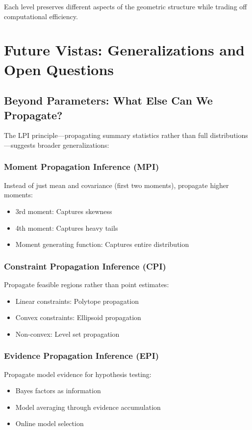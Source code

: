 \documentclass[11pt]{article}
\begin{document}
Each level preserves different aspects of the geometric structure while trading off computational efficiency.

\section{Future Vistas: Generalizations and Open Questions}

\subsection{Beyond Parameters: What Else Can We Propagate?}

The LPI principle—propagating summary statistics rather than full distributions—suggests broader generalizations:

\subsubsection{Moment Propagation Inference (MPI)}
Instead of just mean and covariance (first two moments), propagate higher moments:
\begin{itemize}
\item 3rd moment: Captures skewness
\item 4th moment: Captures heavy tails
\item Moment generating function: Captures entire distribution
\end{itemize}

\subsubsection{Constraint Propagation Inference (CPI)}
Propagate feasible regions rather than point estimates:
\begin{itemize}
\item Linear constraints: Polytope propagation
\item Convex constraints: Ellipsoid propagation
\item Non-convex: Level set propagation
\end{itemize}

\subsubsection{Evidence Propagation Inference (EPI)}
Propagate model evidence for hypothesis testing:
\begin{itemize}
\item Bayes factors as information
\item Model averaging through evidence accumulation
\item Online model selection
\end{itemize}
\end{document}
